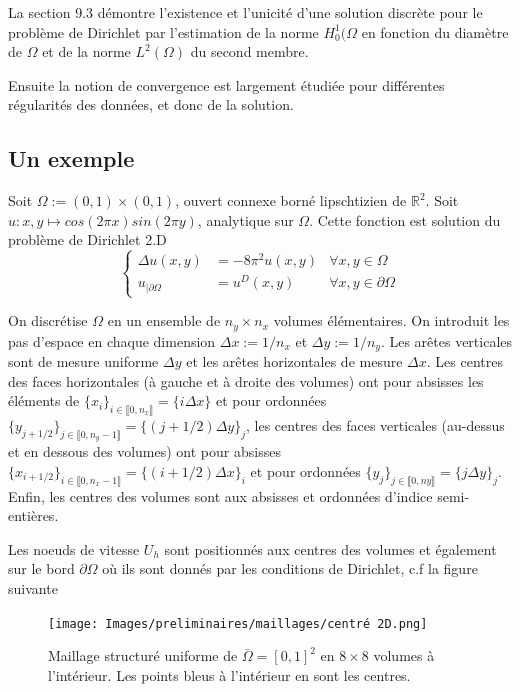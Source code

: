 La section 9.3 démontre l'existence et l'unicité d'une solution discrète pour le problème de Dirichlet par l'estimation de la norme $H^1_0(\Omega$ en fonction du diamètre de $\Omega$ et de la norme $L^2(\Omega)$ du second membre. 

Ensuite la notion de convergence est largement étudiée pour différentes régularités des données, et donc de la solution. 

\subsection*{Un exemple}

Soit $\Omega := (0,1) \times (0,1)$, ouvert connexe borné lipschtizien de $\mathbb{R}^2$. Soit $u: x, y \mapsto cos(2\pi x) sin(2\pi y)$, analytique sur $\Omega$. Cette fonction est solution du problème de Dirichlet 2.D
\begin{equation*}
\left\{\begin{array}{rll}
    \Delta u(x,y) & = -8 \pi^2 u(x, y) & \forall x,y \in \Omega \\
    u_{|\partial \Omega} & = u^D(x, y) & \forall x,y \in \partial \Omega
\end{array}
\right.
\end{equation*}

On discrétise $\Omega$ en un ensemble de $n_y \times n_x$ volumes élémentaires. On introduit les pas d'espace en chaque dimension $\Delta x := 1/n_x$ et $\Delta y := 1/n_y$. Les arêtes verticales sont de mesure uniforme $\Delta y$ et les arêtes horizontales de mesure $\Delta x$. Les centres des faces horizontales (à gauche et à droite des volumes) ont pour absisses les éléments de $\{ x_i \}_{i \in \llbracket 0, n_x \rrbracket} = \{ i \Delta x \}$ et pour ordonnées $\{ y_{j+1/2} \}_{j \in \llbracket 0, n_y-1 \rrbracket} = \{ (j+1/2) \Delta y \}_{j}$, les centres des faces verticales (au-dessus et en dessous des volumes) ont pour absisses $\{ x_{i+1/2} \}_{i \in \llbracket 0, n_x-1 \rrbracket} = \{ (i+1/2) \Delta x \}_i$ et pour ordonnées $\{ y_j \}_{j \in \llbracket 0, ny \rrbracket} = \{j \Delta y\}_j$. Enfin, les centres des volumes sont aux absisses et ordonnées d'indice semi-entières.

Les noeuds de vitesse $U_h$ sont positionnés aux centres des volumes et également sur le bord $\partial \Omega$ où ils sont donnés par les conditions de Dirichlet, c.f la figure suivante

\begin{figure}[htp]
    \centering
    \texttt{[image: Images/preliminaires/maillages/centré 2D.png]}
    \caption{Maillage structuré uniforme de $\bar{\Omega}=[0,1]^2$ en $8 \times 8$ volumes à l'intérieur. Les points bleus à l'intérieur en sont les centres.}
\end{figure}

